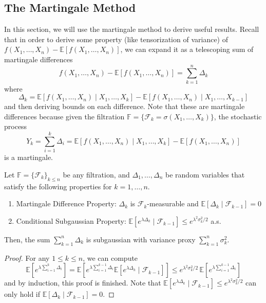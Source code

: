 \documentclass{article}
\begin{document}
  \subsection{The Martingale Method}

  In this section, we will use the martingale method to derive useful results. Recall that in order to derive some property (like tensorization of variance) of $f(X_1, \ldots, X_n) - \mathbb{E}[f(X_1, \ldots, X_n)]$, we can expand it as a telescoping sum of martingale differences 
  \[f(X_1, \ldots, X_n) - \mathbb{E}[f(X_1, \ldots, X_n)] = \sum_{k=1}^n \Delta_k\]
  where 
  \[\Delta_k = \mathbb{E}[f(X_1, \ldots, X_n) \mid X_1, \ldots, X_k] - \mathbb{E}[f(X_1, \ldots, X_n) \mid X_1, \ldots, X_{k-1}]\]
  and then deriving bounds on each difference. Note that these are martingale differences because given the filtration $\mathbb{F} = \{\mathcal{F}_k = \sigma(X_1, \ldots, X_k)\}$, the stochastic process
  \[Y_k = \sum_{i=1}^k \Delta_i = \mathbb{E}[f(X_1, \ldots, X_n) \mid X_1, \ldots, X_k] - \mathbb{E}[f(X_1, \ldots, X_n)]\]
  is a martingale. 

  \begin{lemma}[Azuma]
  Let $\mathbb{F} = \{\mathcal{F}_k\}_{k \leq n}$ be any filtration, and $\Delta_1, \ldots, \Delta_n$ be random variables that satisfy the following properties for $k = 1, \ldots, n$. 
  \begin{enumerate}
      \item Martingale Difference Property: $\Delta_k$ is $\mathcal{F}_k$-measurable and $\mathbb{E}[\Delta_k \mid \mathcal{F}_{k-1}] = 0$ 
      \item Conditional Subgaussian Property: $\mathbb{E}[e^{\lambda \Delta_k} \mid \mathcal{F}_{k-1}] \leq e^{\lambda^2 \sigma^2_k / 2}$ a.s. 
  \end{enumerate}
  Then, the sum $\sum_{k=1}^n \Delta_k$ is subgaussian with variance proxy $\sum_{k=1}^n \sigma_k^2$. 
  \end{lemma}
  \begin{proof}
  For any $1 \leq k \leq n$, we can compute 
  \[\mathbb{E}[ e^{\lambda \sum_{i=1}^k \Delta_i} ] = \mathbb{E}[e^{\lambda \sum_{i=1}^{k-1} \Delta_i} \mathbb{E}[e^{\lambda \Delta_k} \mid \mathcal{F}_{k-1}]] \leq e^{\lambda^2 \sigma_k^2 / 2} \, \mathbb{E}[e^{\lambda \sum_{i=1}^{k-1} \Delta_i}]\]
  and by induction, this proof is finished. Note that $\mathbb{E}[e^{\lambda \Delta_k} \mid \mathcal{F}_{k-1}] \leq e^{\lambda^2 \sigma^2_k / 2}$ can only hold if $\mathbb{E}[\Delta_k \mid \mathcal{F}_{k-1}] = 0$. 
  \end{proof}
\end{document}
